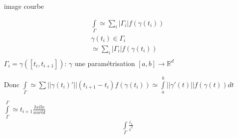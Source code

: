 \documentclass[11pt]{article}
\begin{document}
image courbe

\begin{align*}
\int\limits_{\Gamma} \simeq \sum\limits_i |\Gamma_i| f(\gamma(t_i))\\
\gamma(t_i) \in \Gamma_i \\
\simeq \sum\limits_i |\Gamma_i| f(\gamma(t_i))\\
\end{align*}
\(\Gamma_i = \gamma \left( \left[ t_i, t_{i+1} \right] \right)\): \(\gamma\) une paramétrisation \(\left[a,b\right] \rightarrow \mathbb{R}^d\)

Donc \(\int\limits_{\Gamma} \simeq \sum\limits ||\gamma(t_i)'|| (t_{i+1} - t_i) f(\gamma(t_i)) \simeq \int\limits_{a}^{b} ||\gamma'(t)|| f(\gamma(t)) dt\)

$\int\limits_{\Gamma}^{\Gamma} \simeq t_{i+1} \frac{hello}{world}$
\begin{align*}
  \int\limits_{\Gamma} \frac{i_1}{i^2} 
\end{align*}
\end{document}
